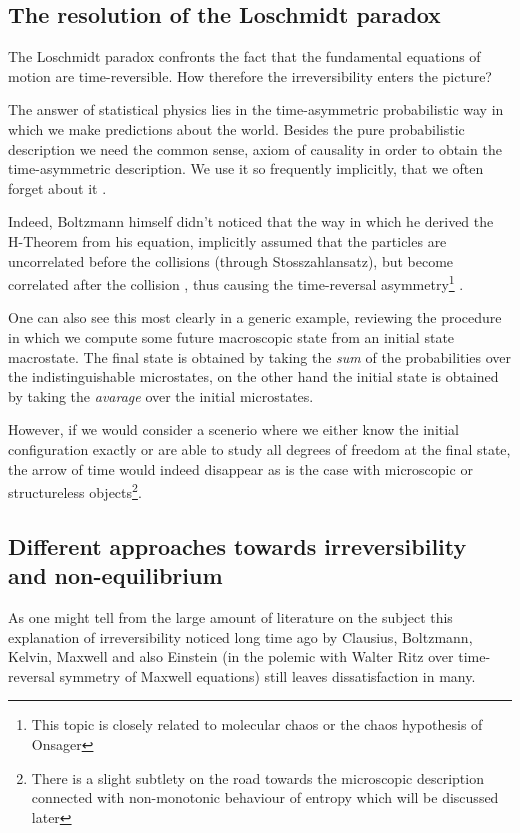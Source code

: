 \documentclass[a4paper,12pt]{article}
\begin{document}
\subsection{The resolution of the Loschmidt paradox }

The Loschmidt paradox confronts the fact that the fundamental equations of motion are time-reversible. How therefore the irreversibility enters the picture?

The answer of statistical physics lies in the time-asymmetric probabilistic way in which we make predictions about the world. 
Besides the pure probabilistic description we need the common sense, axiom of causality in order to obtain the time-asymmetric description.
We use it so frequently implicitly, that we often forget about it \cite{Evans:2241458}. 

Indeed, Boltzmann himself didn't noticed that the way in which he derived the H-Theorem from his equation, implicitly assumed that the particles are uncorrelated before the collisions (through Stosszahlansatz), but become correlated after the collision \cite{Schwabl:2002} \cite{Dorfman:ozm67-zD}, thus causing the time-reversal asymmetry\footnote{This topic is closely related to molecular chaos or the chaos hypothesis of Onsager} .

One can also see this most clearly in a generic example, reviewing the procedure in which we compute some future macroscopic state from an initial state macrostate. The final state is obtained by taking the \textit{sum} of the probabilities over the indistinguishable microstates, on the other hand the initial state is obtained by taking the \textit{avarage} over the initial microstates.

However, if we would consider a scenerio where we either know the initial configuration exactly or are able to study all degrees of freedom at the final state, the arrow of time would indeed disappear as is the case with microscopic or structureless objects\footnote{There is a slight subtlety on the road towards the microscopic description connected with non-monotonic behaviour of entropy which will be discussed later}.

\subsection{Different approaches towards irreversibility and non-equilibrium}

As one might tell from the large amount of literature on the subject \cite{Doyle:wf} \cite{Layzer:1970dx} \cite{Wolfram:552851} \cite{Rovelli:2015tv} \cite{Courbage:1983eo} %
this explanation of irreversibility noticed long time ago by Clausius, Boltzmann\cite{Wolfram:552851}, Kelvin, Maxwell\cite{Anonymous:0uVSJOI5} and also Einstein (in the polemic with Walter Ritz over time-reversal symmetry of Maxwell equations) still leaves dissatisfaction in many.
\end{document}
